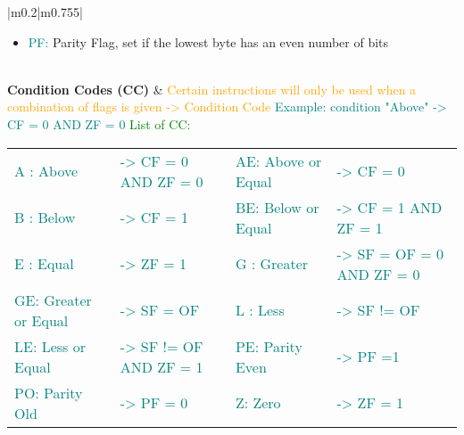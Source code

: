 \documentclass[main.tex,fontsize=8pt,paper=a4,paper=portrait,DIV=calc,]{scrartcl}
\begin{document}
\begin{table}[ht!]
\begin{tabular}{|m{0.2\linewidth}|m{0.755\linewidth}|}
\begin{itemize}
\item \textcolor{teal}{PF:} Parity Flag, set if the lowest byte has an even number of bits
\vspace{-3mm}
\end{itemize}\\
\hline
\textbf{Condition Codes (CC)} & 
\textcolor{orange}{Certain instructions will only be used when a combination of flags is given -> Condition Code}\newline
\textcolor{teal}{Example: condition "Above" -> CF = 0 AND ZF = 0}\newline
\textcolor{green}{List of CC:}\newline
\begin{tabular}{|ll|ll|}
\hline
\textcolor{teal}{A : Above }& \textcolor{teal}{ -> CF = 0 AND ZF = 0}&
\textcolor{teal}{AE: Above or Equal } & \textcolor{teal}{ -> CF = 0}\\
\textcolor{teal}{B : Below } & \textcolor{teal}{ -> CF = 1}&
\textcolor{teal}{BE: Below or Equal } & \textcolor{teal}{ -> CF = 1 AND ZF = 1}\\
\textcolor{teal}{E : Equal }& \textcolor{teal}{ -> ZF = 1}&
\textcolor{teal}{G : Greater }& \textcolor{teal}{ -> SF = OF = 0 AND ZF = 0}\\
\textcolor{teal}{GE: Greater or Equal }& \textcolor{teal}{ -> SF = OF}&
\textcolor{teal}{L : Less }& \textcolor{teal}{ -> SF != OF}\\
\textcolor{teal}{LE: Less or Equal }& \textcolor{teal}{ -> SF != OF AND ZF = 1}&
\textcolor{teal}{PE: Parity Even} & \textcolor{teal}{ -> PF =1}\\
\textcolor{teal}{PO: Parity Old } & \textcolor{teal}{ -> PF = 0}&
\textcolor{teal}{Z:  Zero}&\textcolor{teal}{ -> ZF = 1} \\
\end{tabular}
\\
\hline
\end{tabular}
\end{table}
\pagebreak
\end{document}
